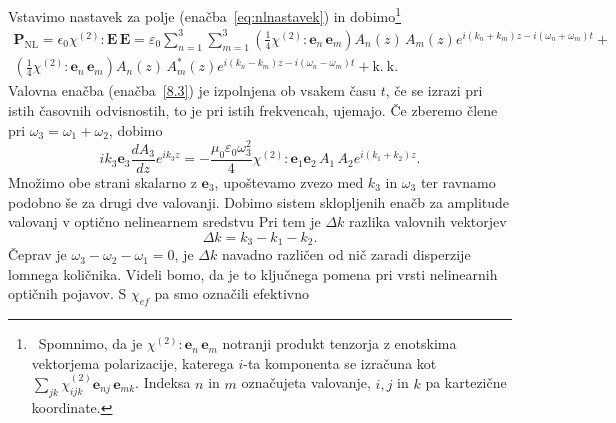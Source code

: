 Vstavimo nastavek za polje (enačba~\ref{eq:nlnastavek}) 
in dobimo\footnote{~Spomnimo, da je $\chi^{(2)}:\mathbf{e}_{n}\,\mathbf{e}_{m}$ 
notranji produkt tenzorja z enotskima vektorjema polarizacije, 
katerega $i$-ta komponenta se izračuna kot $\sum_{jk}\chi^{(2)}_{ijk}\mathbf{e}_{nj}\,\mathbf{e}_{mk}$.
Indeksa $n$ in $m$ označujeta valovanje, $i, j$ in $k$ pa kartezične koordinate.}
\begin{equation}
\begin{split}
\mathbf{P}_{\mathrm{NL}}= \epsilon_{0}\chi^{(2)}:\mathbf{E}\, \mathbf{E} =
\varepsilon_0 \sum_{n=1}^3 \sum_{m=1}^3 
 \left( \frac{1}{4} \chi^{(2)}:\mathbf{e}_{n}\,\mathbf{e}_{m}\right) 
 A_{n}(z)\,A_{m}(z) e^{i(k_{n}+k_{m})z-i(\omega_{n}+\omega_{m})t}+  \\
\left( \frac{1}{4} \chi^{(2)}:\mathbf{e}_{n}\,\mathbf{e}_{m}\right)
A_{n}(z)\,A_{m}^*(z) e^{i(k_{n}-k_{m})z-i(\omega_{n}-\omega_{m})t}+ \mathrm{k.~k.}
\label{8.5b}
\end{split}
\end{equation}
Valovna enačba (enačba~\ref{8.3}) je izpolnjena ob vsakem času $t$, če se izrazi 
pri istih časovnih odvisnostih, to je pri istih frekvencah, ujemajo. Če
zberemo člene pri $\omega_3 = \omega_1 + \omega_2$, dobimo 
\begin{equation}
ik_{3}\mathbf{e}_{3}\frac{dA_{3}}{dz}e^{ik_{3}z}=-\frac{\mu_{0} 
\varepsilon_0 \omega_{3}^{2}}{4}\chi^{(2)}:\mathbf{e}_{1}\mathbf{e}_{2}\,A_{1}\,A_{2}e^{i(k_{1}+k_{2})z}.
\label{8.7}
\end{equation}
Množimo obe strani skalarno z $\mathbf{e}_{3}$, upoštevamo zvezo med $k_{3}$ in $\omega_{3}$
ter ravnamo podobno še za drugi dve valovanji. Dobimo sistem sklopljenih
enačb za amplitude valovanj v optično nelinearnem sredstvu
Pri tem je $\Delta k$ razlika valovnih vektorjev
\begin{equation}
\Delta k = k_{3}-k_{1}-k_{2}.
\end{equation}
Čeprav je $\omega_{3}-\omega_{2}-\omega_{1}=0$, je $\Delta k$ navadno različen od nič zaradi 
disperzije lomnega količnika. Videli bomo, da je to ključnega pomena 
pri vrsti nelinearnih optičnih pojavov. S $\chi_{ef}$ pa smo označili efektivno 
